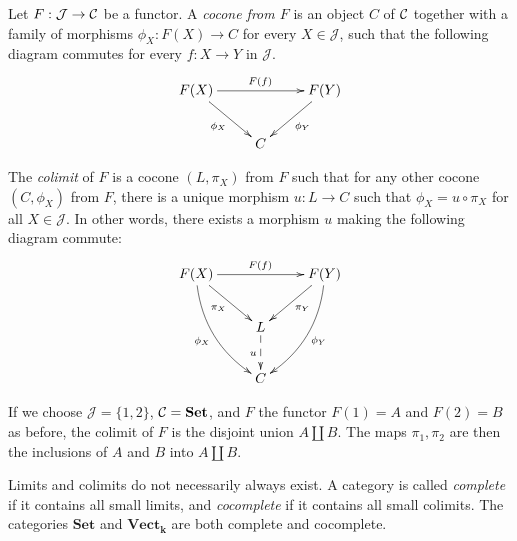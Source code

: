 \begin{definition}
Let $F : \mathcal{J} \to \mathcal{C}$ be a functor. A \emph{cocone from $F$} is an object $C$ of $\mathcal{C}$ together with a family of morphisms $\phi_X : F(X) \to C$ for every $X \in \mathcal{J}$, such that the following diagram commutes for every $f : X \to Y$ in $\mathcal{J}$.
\begin{displaymath}
\xymatrix{
F(X) \ar[rr]^{F(f)} \ar[dr]_{\phi_X} & & F(Y) \ar[dl]^{\phi_Y} \\
& C &
}
\end{displaymath}

The \emph{colimit} of $F$ is a cocone $(L, \pi_X)$ from $F$ such that for any other cocone $(C, \phi_X)$ from $F$, there is a unique morphism $u : L \to C$ such that $\phi_X = u \circ \pi_X$ for all $X \in \mathcal{J}$. In other words, there exists a morphism $u$ making the following diagram commute:
\begin{displaymath}
\xymatrix{
F(X) \ar[rr]^{F(f)} \ar[dr]_{\pi_X} \ar@/_1pc/[ddr]_{\phi_X} & & F(Y) \ar[dl]^{\pi_Y} \ar@/^1pc/[ddl]^{\phi_Y} \\
& L \ar@{-->}[d]_u & \\
& C &
}
\end{displaymath}
\end{definition}

If we choose $\mathcal{J} = \{1, 2\}$, $\mathcal{C} = \mathbf{Set}$, and $F$ the functor $F(1) = A$ and $F(2) = B$ as before, the colimit of $F$ is the disjoint union $A \coprod B$. The maps $\pi_1, \pi_2$ are then the inclusions of $A$ and $B$ into $A \coprod B$.

Limits and colimits do not necessarily always exist. A category is called \emph{complete} if it contains all small limits, and \emph{cocomplete} if it contains all small colimits. The categories $\mathbf{Set}$ and $\mathbf{Vect}_\mathbf{k}$ are both complete and cocomplete.